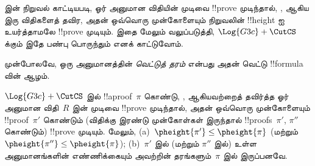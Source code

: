 \documentclass[../../../include/open-logic-section]{subfiles}
\begin{document}


 இன் நிறுவல் காட்டியபடி, 
ஓர் அனுமான விதியின் முடிவை !!{prove} முடிந்தால், \RightR{\lexists},
\LeftR{\lforall} ஆகிய இரு விதிகளைத் தவிர, அதன் ஒவ்வொரு
முன்கோளையும் நிறுவலின் !!{height} ஐ உயர்த்தாமலே !!{prove}
முடியும். இதை மேலும் வலுப்படுத்தி, $ \Log{G3c} + \CutCS$ க்கும்
இதே பண்பு பொருந்தும் எனக் காட்டுவோம்.

முன்போலவே, ஒரு \CutCS{} அனுமானத்தின் \emph{வெட்டுத் தரம்}
என்பது அதன் வெட்டு !!{formula} வின் ஆழம்.

\begin{lem}
$\Log{G3c} + \CutCS$ இல் !!a{proof}~$\pi$ கொண்டு,
\RightR{\lexists}, \LeftR{\lforall} ஆகியவற்றைத் தவிர்த்த
ஓர் அனுமான விதி~$R$ இன் முடிவை !!{prove} முடிந்தால்,
அதன் ஒவ்வொரு முன்கோளையும் !!{proof}~$\pi'$ கொண்டும்
(விதிக்கு இரண்டு முன்கோள்கள் இருந்தால் !!{proof}s~$\pi'$,
$\pi''$ கொண்டும்) !!{prove} முடியும். மேலும்,
(a)~$\pheight{\pi'}\le\pheight{\pi}$
(மற்றும் $\pheight{\pi''}\le\pheight{\pi}$);
(b)~$\pi'$ இல் (மற்றும் $\pi''$ இல்) உள்ள \CutCS{}
அனுமானங்களின் எண்ணிக்கையும் அவற்றின் தரங்களும்~$\pi$ இல்
இருப்பனவே.
\end{lem}
\end{document}
